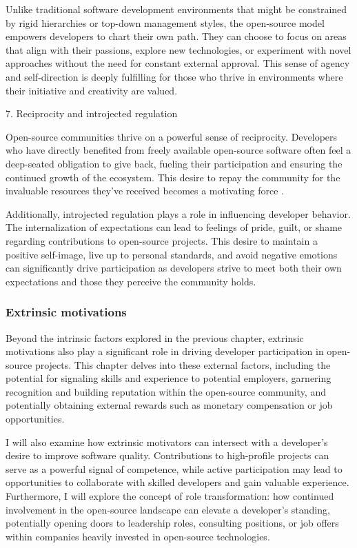Unlike traditional software development environments that might be constrained by rigid hierarchies or top-down management styles, the open-source model empowers developers to chart their own path. They can choose to focus on areas that align with their passions, explore new technologies, or experiment with novel approaches without the need for constant external approval.  This sense of agency and self-direction is deeply fulfilling for those who thrive in environments where their initiative and creativity are valued.

7. Reciprocity and introjected regulation

Open-source communities thrive on a powerful sense of reciprocity. Developers who have directly benefited from freely available open-source software often feel a deep-seated obligation to give back, fueling their participation and ensuring the continued growth of the ecosystem. This desire to repay the community for the invaluable resources they've received becomes a motivating force \cite{11gerosa2021shifting,13li2012leadership}.

Additionally, introjected regulation plays a role in influencing developer behavior. The internalization of expectations can lead to feelings of pride, guilt, or shame regarding contributions to open-source projects. This desire to maintain a positive self-image, live up to personal standards, and avoid negative emotions can significantly drive participation as developers strive to meet both their own expectations and those they perceive the community holds.

\subsubsection{Extrinsic motivations}

Beyond the intrinsic factors explored in the previous chapter, extrinsic motivations also play a significant role in driving developer participation in open-source projects. This chapter delves into these external factors, including the potential for signaling skills and experience to potential employers, garnering recognition and building reputation within the open-source community, and potentially obtaining external rewards such as monetary compensation or job opportunities.

I will also examine how extrinsic motivators can intersect with a developer's  desire to improve software quality. Contributions to high-profile projects can serve as a powerful signal of competence, while active participation may lead to opportunities to collaborate with skilled developers and gain valuable experience.  Furthermore, I will explore the concept of role transformation: how continued involvement in the open-source landscape can elevate a developer's standing, potentially opening doors to leadership roles, consulting positions, or  job offers within companies heavily invested in open-source technologies.

